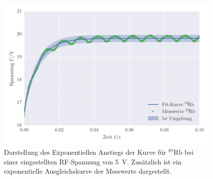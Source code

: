 \FloatBarrier
\begin{figure}[!h]
\centering
\includegraphics[scale=0.85]{../Grafiken/Exponentieller_Anstieg_5V_Rubidium_87.pdf}
\caption{Darstellung des Exponentiellen Anstiegs der Kurve für ${}^{87}\!$Rb bei einer
	eingestellten RF-Spannung von \SI{5}{\volt}. Zusätzlich ist ein exponentielle Ausgleichskurve 
	der Messwerte dargestellt. \label{fig:exponentieller_anstieg_5v_rubidium_87}}
\end{figure}
\FloatBarrier